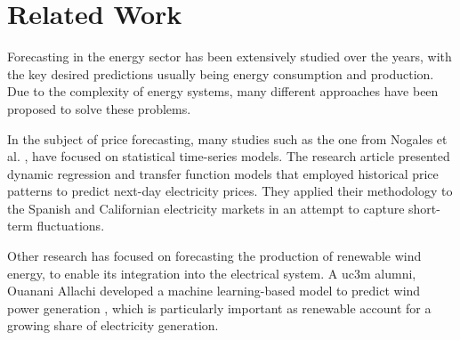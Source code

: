 \documentclass[12pt]{report} %
\begin{document}
\section{Related Work}










Forecasting in the energy sector has been extensively studied over the years, with the key desired predictions usually being energy consumption and production. Due to the complexity of energy systems, many different approaches have been proposed to solve these problems.

In the subject of price forecasting, many studies such as the one from Nogales et al. \cite{time-series-energy}, have focused on statistical time-series models. The research article presented dynamic regression and transfer function models that employed historical price patterns to predict next-day electricity prices. They applied their methodology to the Spanish and Californian electricity markets in an attempt to capture short-term fluctuations.

Other research has focused on forecasting the production of renewable wind energy, to enable its integration into the electrical system. A uc3m alumni, Ouanani Allachi developed a machine learning-based model to predict wind power generation \cite{ml-tfg-uc3m-wind}, which is particularly important as renewable account for a growing share of electricity generation.
\end{document}
